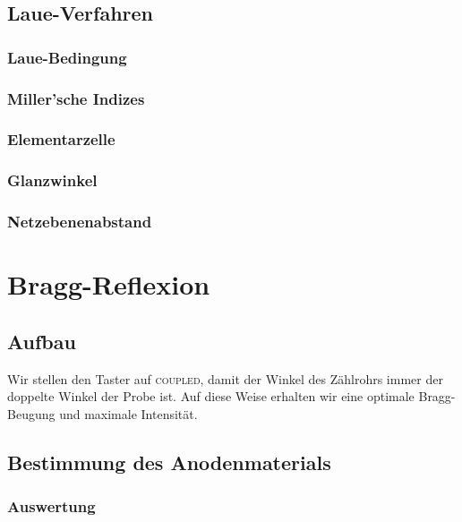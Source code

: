 \section{Laue-Verfahren}

\subsection{Laue-Bedingung}

\subsection{Miller'sche Indizes}

\subsection{Elementarzelle}

\subsection{Glanzwinkel}

\subsection{Netzebenenabstand}

\chapter{Bragg-Reflexion}

\section{Aufbau}

\parencite{wikipedia/Goniometer}
\parencite{wikipedia/hygroskopie}
\parencite{leybold/554831}
\parencite{leybold/554800}

Wir stellen den Taster auf \textsc{coupled}, damit der Winkel des Zählrohrs immer
der doppelte Winkel der Probe ist. \parencite{leybold/554800} Auf diese Weise
erhalten wir eine optimale Bragg-Beugung und maximale Intensität.

\section{Bestimmung des Anodenmaterials}

\subsection{Auswertung}

